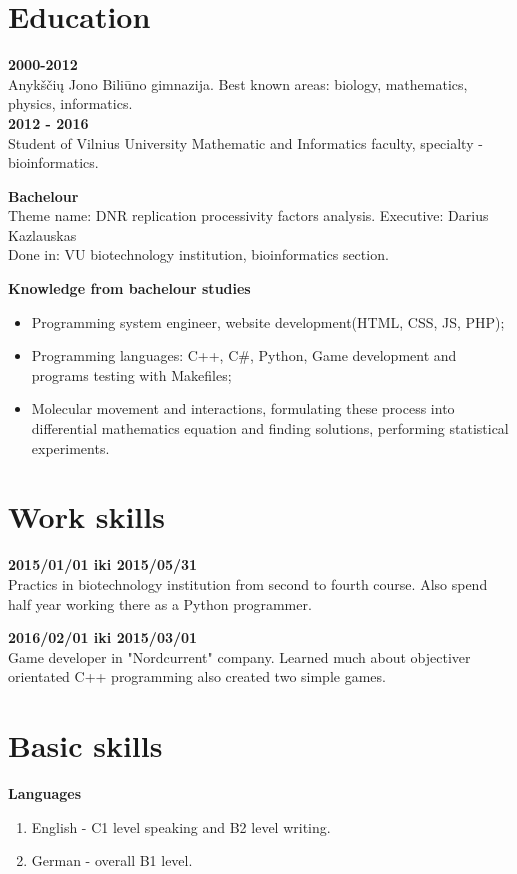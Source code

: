 \documentclass[a4paper,12pt]{article}
\begin{document}
\section{Education}
\textbf{2000-2012} \\
Anykščių Jono Biliūno gimnazija. Best known areas: biology, mathematics, physics, informatics. \\

\textbf{2012 - 2016} \\ 
Student of Vilnius University Mathematic and Informatics faculty, specialty - bioinformatics.

\textbf{Bachelour} \\
Theme name: DNR replication processivity factors analysis.
Executive: Darius Kazlauskas\\
Done in: VU biotechnology institution, bioinformatics section. 

\textbf{Knowledge from bachelour studies}
\begin{itemize}
	\item Programming system engineer, website development(HTML, CSS, JS, PHP);
	
	\item Programming languages: C++, C\#, Python, Game development and programs testing with Makefiles;
	
	\item Molecular movement and interactions, formulating these process into differential mathematics equation and finding solutions, performing statistical experiments.
\end{itemize}

\clearpage

\vspace{8cm}


\section{Work skills}
\textbf{2015/01/01 iki 2015/05/31} \\
Practics in biotechnology institution from second to fourth course. Also spend half year working there as a Python programmer.

\vspace{0.5cm}
\textbf{2016/02/01 iki 2015/03/01} \\
Game developer in "Nordcurrent" company. Learned much about objectiver orientated C++ programming also created two simple games.
\vspace{0.5cm}


\section{Basic skills}
\textbf{Languages}
\begin{enumerate}
	\item English - C1 level speaking and B2 level writing. 
	\item German - overall B1 level.
\end{enumerate}
\end{document}
